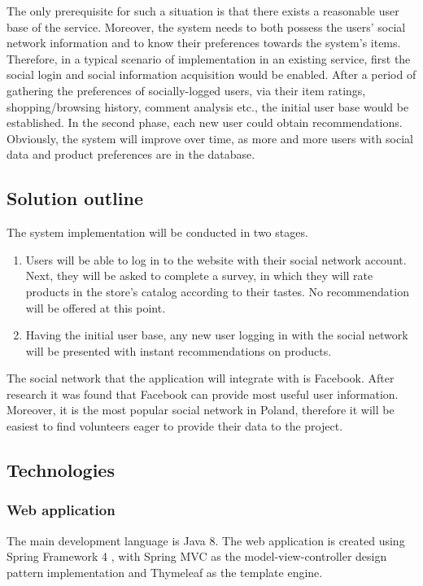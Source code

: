 \documentclass[12pt]{report}
\begin{document}
The only prerequisite for such a situation is that there exists a reasonable user base of the service. Moreover, the system needs to both possess the users' social network information and to know their preferences towards the system's items. Therefore, in a typical scenario of implementation in an existing service, first the social login and social information acquisition would be enabled. After a period of gathering the preferences of socially-logged users, via their item ratings, shopping/browsing history, comment analysis etc., the initial user base would be established. In the second phase, each new user could obtain recommendations. Obviously, the system will improve over time, as more and more users with social data and product preferences are in the database.

\subsection{Solution outline}

The system implementation will be conducted in two stages.
\begin{enumerate}
\item Users will be able to log in to the website with their social network account. Next, they will be asked to complete a survey, in which they will rate products in the store's catalog according to their tastes. No recommendation will be offered at this point.
\item Having the initial user base, any new user logging in with the social network will be presented with instant recommendations on products.
\end{enumerate}

The social network that the application will integrate with is Facebook. After research it was found that Facebook can provide most useful user information. Moreover, it is the most popular social network in Poland, therefore it will be easiest to find volunteers eager to provide their data to the project.

\subsection{Technologies}
\subsubsection{Web application}
The main development language is Java 8. The web application is created using Spring Framework 4 \cite{spring_framework}, with Spring MVC as the model-view-controller design pattern implementation and Thymeleaf as the template engine. 
\end{document}

